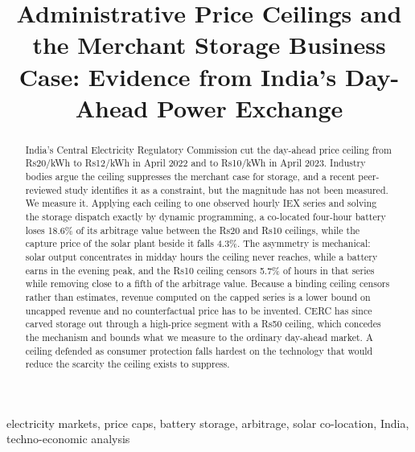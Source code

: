 \documentclass[conference,a4paper]{IEEEtran}
\begin{document}
\title{Administrative Price Ceilings and the Merchant Storage Business Case:
Evidence from India's Day-Ahead Power Exchange}

\author{
\and
{}
}

\maketitle

\begin{abstract}
India's Central Electricity Regulatory Commission cut the day-ahead price
ceiling from Rs20/kWh to Rs12/kWh in April 2022 and to Rs10/kWh in April 2023.
Industry bodies argue the ceiling suppresses the merchant case for storage, and
a recent peer-reviewed study identifies it as a constraint, but the magnitude
has not been measured. We measure it. Applying each ceiling to one observed
hourly IEX series and solving the storage dispatch exactly by dynamic
programming, a co-located four-hour battery loses 18.6\% of its arbitrage value
between the Rs20 and Rs10 ceilings, while the capture price of the solar plant
beside it falls 4.3\%. The asymmetry is mechanical: solar output concentrates in
midday hours the ceiling never reaches, while a battery earns in the evening
peak, and the Rs10 ceiling censors 5.7\% of hours in that series while removing
close to a fifth of the arbitrage value. Because a binding ceiling censors rather
than estimates, revenue computed on the capped series is a lower bound on
uncapped revenue and no counterfactual price has to be invented. CERC has since
carved storage out through a high-price segment with a Rs50 ceiling, which
concedes the mechanism and bounds what we measure to the ordinary day-ahead
market. A ceiling defended as consumer protection falls hardest on the
technology that would reduce the scarcity the ceiling exists to suppress.
\end{abstract}

\begin{IEEEkeywords}
electricity markets, price caps, battery storage, arbitrage, solar
co-location, India, techno-economic analysis
\end{IEEEkeywords}
\end{document}
